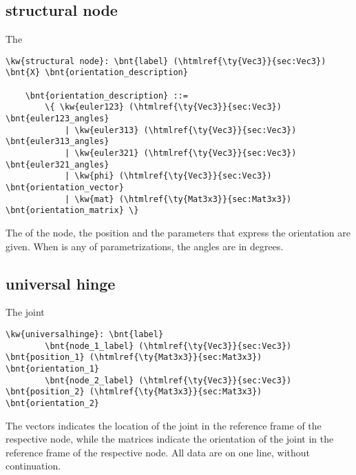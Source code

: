 \subsection{structural node}
\label{sec:APP:LOGFILE:STRUCTURAL_NODE}
The 
\begin{Verbatim}[commandchars=\\\{\}]
    \kw{structural node}: \bnt{label} (\htmlref{\ty{Vec3}}{sec:Vec3}) \bnt{X} \bnt{orientation_description}

    \bnt{orientation_description} ::=
        \{ \kw{euler123} (\htmlref{\ty{Vec3}}{sec:Vec3}) \bnt{euler123_angles}
            | \kw{euler313} (\htmlref{\ty{Vec3}}{sec:Vec3}) \bnt{euler313_angles}
            | \kw{euler321} (\htmlref{\ty{Vec3}}{sec:Vec3}) \bnt{euler321_angles}
            | \kw{phi} (\htmlref{\ty{Vec3}}{sec:Vec3}) \bnt{orientation_vector}
            | \kw{mat} (\htmlref{\ty{Mat3x3}}{sec:Mat3x3}) \bnt{orientation_matrix} \}
\end{Verbatim}
The  of the node, the position 
and the  parameters that express the orientation
are given.
When  is any of  parametrizations,
the angles are in degrees.

\subsection{universal hinge}
The  joint
\begin{Verbatim}[commandchars=\\\{\}]
    \kw{universalhinge}: \bnt{label}
        \bnt{node_1_label} (\htmlref{\ty{Vec3}}{sec:Vec3}) \bnt{position_1} (\htmlref{\ty{Mat3x3}}{sec:Mat3x3}) \bnt{orientation_1}
        \bnt{node_2_label} (\htmlref{\ty{Vec3}}{sec:Vec3}) \bnt{position_2} (\htmlref{\ty{Mat3x3}}{sec:Mat3x3}) \bnt{orientation_2}
\end{Verbatim}
The  vectors indicates the location of the joint
in the reference frame of the respective node,
while the  matrices indicate the orientation of the joint
in the reference frame of the respective node.
All data are on one line, without continuation.


